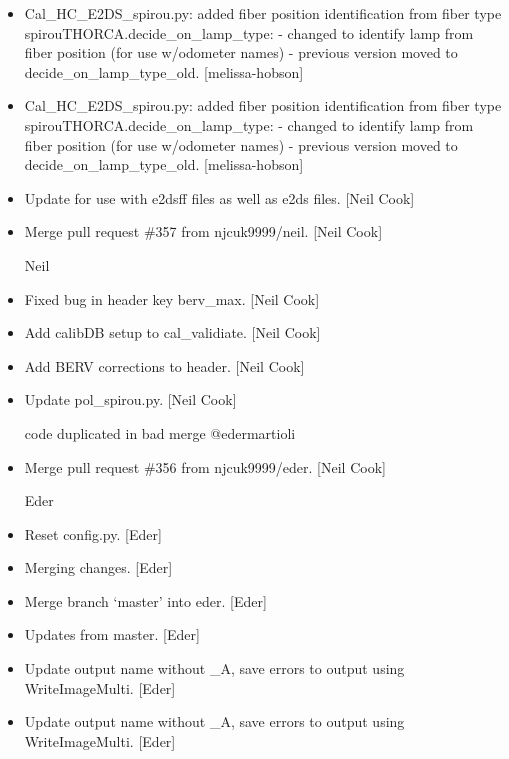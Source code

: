 \documentclass[a4paper,10pt,english]{report}
\begin{document}
\begin{itemize}
\item {} 
Cal\_HC\_E2DS\_spirou.py: added fiber position identification from fiber
type spirouTHORCA.decide\_on\_lamp\_type: - changed to identify lamp from
fiber position (for use w/odometer names) - previous version moved to
decide\_on\_lamp\_type\_old. {[}melissa-hobson{]}

\item {} 
Cal\_HC\_E2DS\_spirou.py: added fiber position identification from fiber
type spirouTHORCA.decide\_on\_lamp\_type: - changed to identify lamp from
fiber position (for use w/odometer names) - previous version moved to
decide\_on\_lamp\_type\_old. {[}melissa-hobson{]}

\item {} 
Update for use with e2dsff files as well as e2ds files. {[}Neil Cook{]}

\item {} 
Merge pull request \#357 from njcuk9999/neil. {[}Neil Cook{]}

Neil

\item {} 
Fixed bug in header key berv\_max. {[}Neil Cook{]}

\item {} 
Add calibDB setup to cal\_validiate. {[}Neil Cook{]}

\item {} 
Add BERV corrections to header. {[}Neil Cook{]}

\item {} 
Update pol\_spirou.py. {[}Neil Cook{]}

code duplicated in bad merge @edermartioli

\item {} 
Merge pull request \#356 from njcuk9999/eder. {[}Neil Cook{]}

Eder

\item {} 
Reset config.py. {[}Eder{]}

\item {} 
Merging changes. {[}Eder{]}

\item {} 
Merge branch ‘master’ into eder. {[}Eder{]}

\item {} 
Updates from master. {[}Eder{]}

\item {} 
Update output name without \_A, save errors to output using
WriteImageMulti. {[}Eder{]}

\item {} 
Update output name without \_A, save errors to output using
WriteImageMulti. {[}Eder{]}


\end{itemize}
\end{document}
